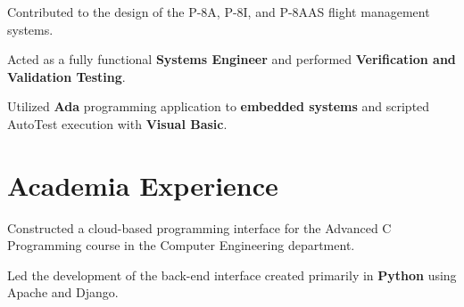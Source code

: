 \documentclass[letterpaper]{deedy-resume} %
\begin{document}
\begin{minipage}[t]{0.66\textwidth}
\begin{tightitemize}
\item Contributed to the design of the P-8A, P-8I, and P-8AAS flight management systems.
\item Acted as a fully functional \textbf{Systems Engineer} and performed \textbf{Verification and Validation Testing}.
\item Utilized \textbf{Ada} programming application to \textbf{embedded systems} and scripted AutoTest execution with \textbf{Visual Basic}.
\end{tightitemize}



\sectionspace %


\section{Academia Experience}


\begin{tightitemize}
\item Constructed a cloud-based programming interface for the Advanced C Programming course in the Computer Engineering department.
\item Led the development of the back-end interface created primarily in \textbf{Python} using Apache and Django.
\end{tightitemize}

\sectionspace %




\end{minipage}
\end{document}
